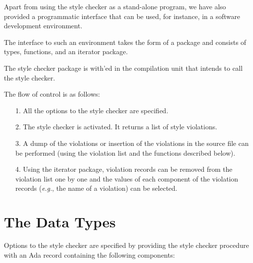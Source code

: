 Apart from using the style checker as a stand-alone program,
we have also provided a programmatic interface that can be used, for instance,
in a software development environment.

The interface to such an environment takes the form of a package and consists of types, functions, and an iterator package. 

The style checker package is with'ed in the compilation unit that intends to 
call the style checker.

The flow of control is as follows:
\begin{itemize}
\item [1.] All the options to the style checker are specified.
\item [2.] The style checker is activated. It returns a list of style violations.
\item [3.] A dump of the violations or insertion of the violations in the source
file can be performed (using the violation list and the functions described below).
\item [4.] Using the iterator package, violation records can be removed from the 
violation list one by one and the values of each component of the violation 
records ({\em e.g.}, the name of a violation) can be selected.
\end{itemize}

\section{The Data Types}

Options to the style checker are specified by
providing the style checker procedure with an Ada record containing the
following components:


